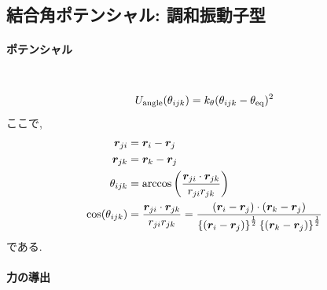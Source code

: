 \clearpage

\subsection{結合角ポテンシャル: 調和振動子型}
\paragraph{ポテンシャル} \
\begin{equation}
   U_{\mathrm{angle}}(\theta_{ijk})
   =
   k_{\theta} (\theta_{ijk} - \theta_{\mathrm{eq}})^{2}
   \notag
\end{equation}
ここで, 
\begin{align}
   \bm{r}_{ji}
   &= \bm{r}_{i} - \bm{r}_{j}
   \notag \\
   \bm{r}_{jk}
   &= \bm{r}_{k} - \bm{r}_{j}
   \notag \\
    \theta_{ijk}
   &= \arccos \left( \frac{\bm{r}_{ji} \cdot \bm{r}_{jk}}{r_{ji} r_{jk}} \right)
   \notag \\
   \cos(\theta_{ijk})
   &= \frac{\bm{r}_{ji} \cdot \bm{r}_{jk}}{r_{ji} r_{jk}}
   = \frac{(\bm{r}_{i} - \bm{r}_{j}) \cdot (\bm{r}_{k} - \bm{r}_{j})}
         {\left\{(\bm{r}_{i} - \bm{r}_{j})\right\}^{\frac{1}{2}}
          \left\{(\bm{r}_{k} - \bm{r}_{j})\right\}^{\frac{1}{2}}}
   \notag
\end{align}
である.

\paragraph{力の導出} \

